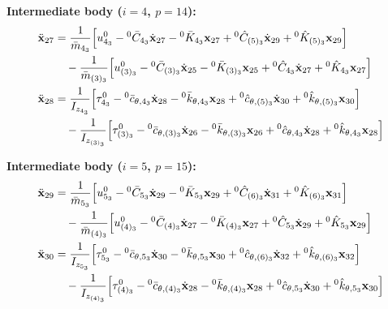 \documentclass[11pt]{article}
\theoremstyle{definition}
\begin{document}
\textbf{Intermediate body ($i=4$, $p=14$):}
\begin{align}
    \ddot{\mathbf{x}}_{27} &= 
    \frac{1}{\bar{m}_{4_3}} \Big[ u^0_{4_3} - {}^0\bar{C}_{4_3}\dot{\mathbf{x}}_{27} - {}^0\bar{K}_{4_3}\mathbf{x}_{27} + {}^0\hat{C}_{(5)_3}\dot{\mathbf{x}}_{29} + {}^0\hat{K}_{(5)_3}\mathbf{x}_{29} \Big] \notag \\
    &\quad - \frac{1}{\bar{m}_{(3)_3}} \Big[ u^0_{(3)_3} - {}^0\bar{C}_{(3)_3}\dot{\mathbf{x}}_{25} - {}^0\bar{K}_{(3)_3}\mathbf{x}_{25} + {}^0\hat{C}_{4_3}\dot{\mathbf{x}}_{27} + {}^0\hat{K}_{4_3}\mathbf{x}_{27} \Big] \\
    \ddot{\mathbf{x}}_{28} &= 
    \frac{1}{I_{z_{4_3}}} \Big[ \tau^0_{4_3} - {}^0\bar{c}_{\theta,4_3}\dot{\mathbf{x}}_{28} - {}^0\bar{k}_{\theta,4_3}\mathbf{x}_{28} + {}^0\hat{c}_{\theta,(5)_3}\dot{\mathbf{x}}_{30} + {}^0\hat{k}_{\theta,(5)_3}\mathbf{x}_{30} \Big] \notag \\
    &\quad - \frac{1}{I_{z_{(3)_3}}} \Big[ \tau^0_{(3)_3} - {}^0\bar{c}_{\theta,(3)_3}\dot{\mathbf{x}}_{26} - {}^0\bar{k}_{\theta,(3)_3}\mathbf{x}_{26} + {}^0\hat{c}_{\theta,4_3}\dot{\mathbf{x}}_{28} + {}^0\hat{k}_{\theta,4_3}\mathbf{x}_{28} \Big]
\end{align}

\textbf{Intermediate body ($i=5$, $p=15$):}
\begin{align}
    \ddot{\mathbf{x}}_{29} &= 
    \frac{1}{\bar{m}_{5_3}} \Big[ u^0_{5_3} - {}^0\bar{C}_{5_3}\dot{\mathbf{x}}_{29} - {}^0\bar{K}_{5_3}\mathbf{x}_{29} + {}^0\hat{C}_{(6)_3}\dot{\mathbf{x}}_{31} + {}^0\hat{K}_{(6)_3}\mathbf{x}_{31} \Big] \notag \\
    &\quad - \frac{1}{\bar{m}_{(4)_3}} \Big[ u^0_{(4)_3} - {}^0\bar{C}_{(4)_3}\dot{\mathbf{x}}_{27} - {}^0\bar{K}_{(4)_3}\mathbf{x}_{27} + {}^0\hat{C}_{5_3}\dot{\mathbf{x}}_{29} + {}^0\hat{K}_{5_3}\mathbf{x}_{29} \Big] \\
    \ddot{\mathbf{x}}_{30} &= 
    \frac{1}{I_{z_{5_3}}} \Big[ \tau^0_{5_3} - {}^0\bar{c}_{\theta,5_3}\dot{\mathbf{x}}_{30} - {}^0\bar{k}_{\theta,5_3}\mathbf{x}_{30} + {}^0\hat{c}_{\theta,(6)_3}\dot{\mathbf{x}}_{32} + {}^0\hat{k}_{\theta,(6)_3}\mathbf{x}_{32} \Big] \notag \\
    &\quad - \frac{1}{I_{z_{(4)_3}}} \Big[ \tau^0_{(4)_3} - {}^0\bar{c}_{\theta,(4)_3}\dot{\mathbf{x}}_{28} - {}^0\bar{k}_{\theta,(4)_3}\mathbf{x}_{28} + {}^0\hat{c}_{\theta,5_3}\dot{\mathbf{x}}_{30} + {}^0\hat{k}_{\theta,5_3}\mathbf{x}_{30} \Big]
\end{align}
\end{document}
